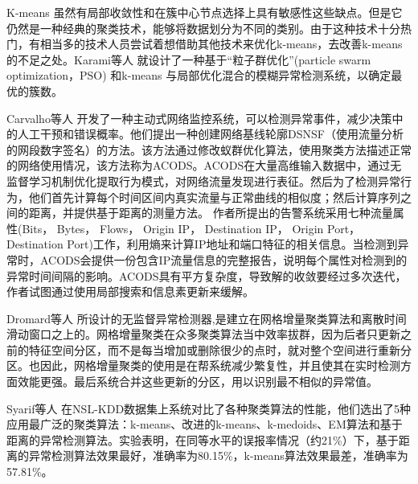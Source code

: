 K-means 虽然有局部收敛性和在簇中心节点选择上具有敏感性这些缺点。但是它仍然是一种经典的聚类技术，能够将数据划分为不同的类别。由于这种技术十分热门，有相当多的技术人员尝试着想借助其他技术来优化k-means，去改善k-means的不足之处。Karami等人\cite{2015Karami} 就设计了一种基于“粒子群优化”(particle swarm optimization，PSO) 和k-means 与局部优化混合的模糊异常检测系统，以确定最优的簇数。



Carvalho等人\cite{carvalho2016unsupervised} 开发了一种主动式网络监控系统，可以检测异常事件，减少决策中的人工干预和错误概率。他们提出一种创建网络基线轮廓DSNSF（使用流量分析的网段数字签名）的方法。该方法通过修改蚁群优化算法，使用聚类方法描述正常的网络使用情况，该方法称为ACODS。ACODS在大量高维输入数据中，通过无监督学习机制优化提取行为模式，对网络流量发现进行表征。然后为了检测异常行为，他们首先计算每个时间区间内真实流量与正常曲线的相似度；然后计算序列之间的距离，并提供基于距离的测量方法。
作者所提出的告警系统采用七种流量属性(Bits， Bytes， Flows， Origin IP， Destination IP， Origin Port， Destination Port)工作，利用熵来计算IP地址和端口特征的相关信息。当检测到异常时，ACODS会提供一份包含IP流量信息的完整报告，说明每个属性对检测到的异常时间间隔的影响。ACODS具有平方复杂度，导致解的收敛要经过多次迭代，作者试图通过使用局部搜索和信息素更新来缓解。

Dromard等人\cite{dromard2016online} 所设计的无监督异常检测器,是建立在网格增量聚类算法和离散时间滑动窗口之上的。网格增量聚类在众多聚类算法当中效率拔群，因为后者只更新之前的特征空间分区，而不是每当增加或删除很少的点时，就对整个空间进行重新分区。也因此，网格增量聚类的使用是在帮系统减少繁复性，并且使其在实时检测方面效能更强。最后系统合并这些更新的分区，用以识别最不相似的异常值。



Syarif等人\cite{2012syarif} 在NSL-KDD数据集上系统对比了各种聚类算法的性能，他们选出了5种应用最广泛的聚类算法：k-means、改进的k-means、k-medoids、EM算法和基于距离的异常检测算法。实验表明，在同等水平的误报率情况（约21\%）下，基于距离的异常检测算法效果最好，准确率为80.15\%，k-means算法效果最差，准确率为57.81\%。

